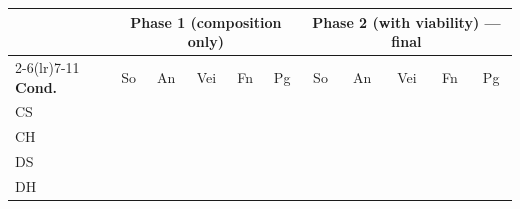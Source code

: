 \begin{tabular}{@{}l ccccc ccccc@{}}
\toprule
& \multicolumn{5}{c}{\textbf{Phase 1 (composition only)}} & \multicolumn{5}{c}{\textbf{Phase 2 (with viability) --- final}}\\
\cmidrule(lr){2-6}\cmidrule(lr){7-11}
\textbf{Cond.} & So & An & Vei & Fn & Pg & So & An & Vei & Fn & Pg\\
\midrule
CS & \TBD{} & \TBD{} & \TBD{} & \TBD{} & \TBD{} & \TBD{} & \TBD{} & \TBD{} & \TBD{} & \TBD{}\\
CH & \TBD{} & \TBD{} & \TBD{} & \TBD{} & \TBD{} & \TBD{} & \TBD{} & \TBD{} & \TBD{} & \TBD{}\\
DS & \TBD{} & \TBD{} & \TBD{} & \TBD{} & \TBD{} & \TBD{} & \TBD{} & \TBD{} & \TBD{} & \TBD{}\\
DH & \TBD{} & \TBD{} & \TBD{} & \TBD{} & \TBD{} & \TBD{} & \TBD{} & \TBD{} & \TBD{} & \TBD{}\\
\bottomrule
\end{tabular}
